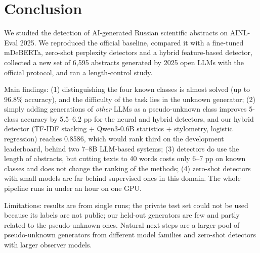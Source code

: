 \documentclass{article}
\begin{document}
\section{Conclusion}
We studied the detection of AI-generated Russian scientific abstracts on AINL-Eval 2025. We reproduced the official baseline, compared it with a fine-tuned mDeBERTa, zero-shot perplexity detectors and a hybrid feature-based detector, collected a new set of 6{,}595 abstracts generated by 2025 open LLMs with the official protocol, and ran a length-control study.

Main findings: (1) distinguishing the four known classes is almost solved (up to 96.8\% accuracy), and the difficulty of the task lies in the unknown generator; (2) simply adding generations of \emph{other} LLMs as a pseudo-unknown class improves 5-class accuracy by 5.5--6.2 pp for the neural and hybrid detectors, and our hybrid detector (TF-IDF stacking + Qwen3-0.6B statistics + stylometry, logistic regression) reaches 0.8586, which would rank third on the development leaderboard, behind two 7--8B LLM-based systems; (3) detectors do use the length of abstracts, but cutting texts to 40 words costs only 6--7 pp on known classes and does not change the ranking of the methods; (4) zero-shot detectors with small models are far behind supervised ones in this domain. The whole pipeline runs in under an hour on one GPU.

Limitations: results are from single runs; the private test set could not be used because its labels are not public; our held-out generators are few and partly related to the pseudo-unknown ones. Natural next steps are a larger pool of pseudo-unknown generators from different model families and zero-shot detectors with larger observer models.






\end{document}
